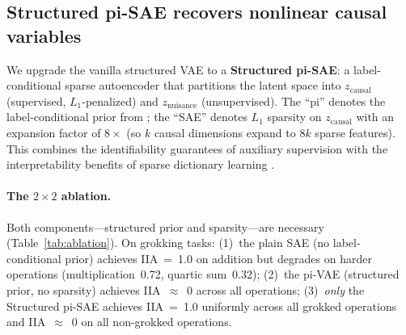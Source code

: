 \documentclass{article}
\begin{document}
\subsection{Structured pi-SAE recovers nonlinear causal variables}
\label{sec:vae_results}

We upgrade the vanilla structured VAE to a \textbf{Structured pi-SAE}: a
label-conditional sparse autoencoder that partitions the latent space into
$z_\text{causal}$ (supervised, $L_1$-penalized) and $z_\text{nuisance}$
(unsupervised). The ``pi'' denotes the label-conditional prior from
\citet{narayanaswamy2017learning}; the ``SAE'' denotes $L_1$ sparsity on
$z_\text{causal}$ with an expansion factor of $8\times$ (so $k$ causal
dimensions expand to $8k$ sparse features). This combines the identifiability
guarantees of auxiliary supervision \citep{khemakhem2020variational} with the
interpretability benefits of sparse dictionary learning
\citep{bricken2023towards}.

\paragraph{The $2 \times 2$ ablation.}
Both components---structured prior and sparsity---are necessary
(Table~\ref{tab:ablation}). On grokking tasks: (1)~the plain SAE (no
label-conditional prior) achieves IIA~=~1.0 on addition but degrades on harder
operations (multiplication~0.72, quartic sum~0.32); (2)~the pi-VAE (structured
prior, no sparsity) achieves IIA~$\approx$~0 across all operations;
(3)~\emph{only} the Structured pi-SAE achieves IIA~=~1.0 uniformly across all
grokked operations and IIA~$\approx$~0 on all non-grokked operations.
\end{document}
